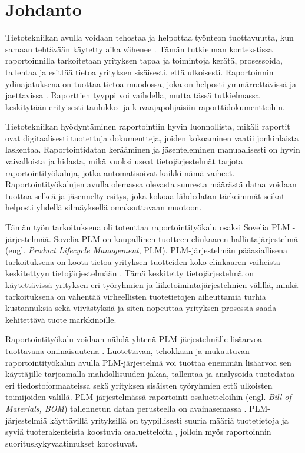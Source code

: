 \chapter{Johdanto} \label{Johdanto}

Tietotekniikan avulla voidaan tehostaa ja helpottaa työnteon tuottavuutta, kun samaan tehtävään käytetty aika vähenee \cite{rakovic_digital_2022}. Tämän tutkielman kontekstissa raportoinnilla tarkoitetaan yrityksen tapaa ja toimintoja kerätä, prosessoida, tallentaa ja esittää tietoa yrityksen sisäisesti, että ulkoisesti. Raportoinnin ydinajatuksena on tuottaa tietoa muodossa, joka on helposti ymmärrettävissä ja jaettavissa \cite{glockner_reports_2022}. Raporttien tyyppi voi vaihdella, mutta tässä tutkielmassa keskitytään erityisesti taulukko- ja kuvaajapohjaisiin raporttidokumentteihin.
 
Tietotekniikan hyödyntäminen raportointiin hyvin luonnollista, mikäli raportit ovat digitaalisesti tuotettuja dokumentteja, joiden kokoaminen vaatii jonkinlaista laskentaa. Raportointidatan kerääminen ja jäsenteleminen manuaalisesti on hyvin vaivalloista ja hidasta, mikä vuoksi useat tietojärjestelmät tarjota raportointityökaluja, jotka automatisoivat kaikki nämä vaiheet. Raportointityökalujen avulla olemassa olevasta suuresta määrästä dataa voidaan tuottaa selkeä ja jäsennelty esitys, joka kokoaa lähdedatan tärkeimmät seikat helposti yhdellä silmäyksellä omaksuttavaan muotoon.\cite{adhi_performance_2019}

Tämän työn tarkoituksena oli toteuttaa raportointityökalu osaksi Sovelia PLM -järjestelmää. Sovelia PLM on kaupallinen tuotteen elinkaaren hallintajärjestelmä  (engl. \textit{Product Lifecycle Management}, PLM)\cite{soveliaAboutSovelia}. PLM-järjestelmän pääasiallisena tarkoituksena on koota tietoa yrityksen tuotteiden koko elinkaaren vaiheista keskitettyyn tietojärjestelmään \cite{alemanni_key_2008}. Tämä keskitetty tietojärjestelmä on käytettävissä yrityksen eri työryhmien ja liiketoimintajärjestelmien välillä, minkä tarkoituksena on vähentää virheellisten tuotetietojen aiheuttamia turhia kustannuksia sekä viivästyksiä ja siten nopeuttaa yrityksen prosessia saada kehitettävä tuote markkinoille. \cite{alemanni_key_2008}

Raportointityökalu voidaan nähdä yhtenä PLM järjestelmälle lisäarvoa tuottavana ominaisuutena \cite{german_challenge_2016}. Luotettavan, tehokkaan ja mukautuvan raportointityökalun avulla PLM-järjestelmä voi tuottaa enemmän lisäarvoa sen käyttäjille tarjoamalla mahdollisuuden jakaa, tallentaa ja analysoida tuotedataa eri tiedostoformaateissa sekä yrityksen sisäisten työryhmien että ulkoisten toimijoiden välillä.\cite{german_challenge_2016} PLM-järjestelmässä raportointi osaluetteloihin (engl. \textit{Bill of Materials, BOM}) tallennetun datan perusteella on avainasemassa \cite{german_challenge_2016}. PLM-järjestelmiä käyttävillä yrityksillä on tyypillisesti suuria määriä tuotetietoja ja syviä tuoterakenteista koostuvia osaluetteloita \cite{rohleder_requirements_2014}, jolloin myös raportoinnin suorituskykyvaatimukset korostuvat.

